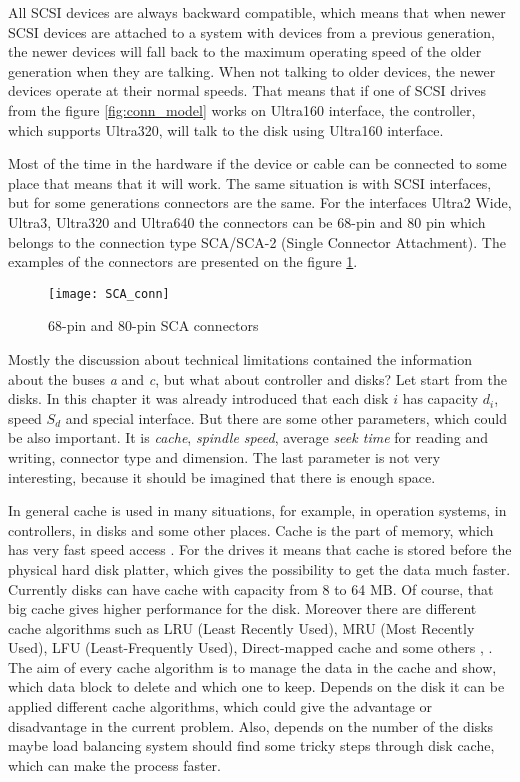 All SCSI devices are always backward compatible, which means that when newer SCSI devices are attached to a system with devices from a previous generation, the newer devices will fall back to the maximum operating speed of the older generation when they are talking. When not talking to older devices, the newer devices operate at their normal speeds. That means that if one of SCSI drives from the figure \ref{fig:conn_model} works on Ultra160 interface, the controller, which supports Ultra320, will talk to the disk using Ultra160 interface.

Most of the time in the hardware if the device or cable can be connected to some place that means that it will work. The same situation is with SCSI interfaces, but for some generations connectors are the same. For the interfaces Ultra2 Wide, Ultra3, Ultra320 and Ultra640 the connectors can be 68-pin and 80 pin which belongs to the connection type SCA/SCA-2 (Single Connector Attachment). The examples of the connectors are presented on the figure \ref{fig:SCA_conn}.
\begin{figure}[h]
\begin{center}
	\label{fig:SCA_conn}
  \texttt{[image: SCA\_conn]}
\end{center}
  \caption{68-pin and 80-pin SCA connectors}
  \label{fig:SCA_conn}
\end{figure}


Mostly the discussion about technical limitations contained the information about the buses \emph{a} and \emph{c}, but what about controller and disks? Let start from the disks. In this chapter it was already introduced that each disk $i$ has capacity $d_i$, speed $S_d$ and special interface. But there are some other parameters, which could be also important. It is \emph{cache}, \emph{spindle speed}, average \emph{seek time} for reading and writing, connector type and dimension. The last parameter is not very interesting, because it should be imagined that there is enough space.

In general cache is used in many situations, for example, in operation systems, in controllers, in disks and some other places. Cache is the part of memory, which has very fast speed access \cite{intro_scsi_perform}. For the drives it means that cache is stored before the physical hard disk platter, which gives the possibility to get the data much faster. Currently disks can have cache with capacity from 8 to 64 MB. Of course, that big cache gives higher performance for the disk. Moreover there are different cache algorithms such as LRU (Least Recently Used), MRU (Most Recently Used), LFU (Least-Frequently Used), Direct-mapped cache and some others \cite{cache_alg}, \cite{cache_strategies}. The aim of every cache algorithm is to manage the data in the cache and show, which data block to delete and which one to keep. Depends on the disk it can be applied different cache algorithms, which could give the advantage or disadvantage in the current problem. Also, depends on the number of the disks maybe load balancing system should find some tricky steps through disk cache, which can make the process faster.

